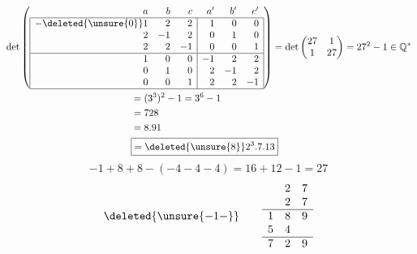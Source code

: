 \[
\begin{aligned}
&\det\left(
\begin{array}{|rrr|rrr|}
\multicolumn{1}{r}{a}&b&\multicolumn{1}{r}{c}&a'&b'&\multicolumn{1}{r}{c'}\\ \hline
-\deleted{\unsure{0}}1&2&2&1&0&0\\
2&-1&2&0&1&0\\
2&2&-1&0&0&1\\ \hline
1&0&0&-1&2&2\\
0&1&0&2&-1&2\\
0&0&1&2&2&-1\\ \hline
\end{array}\right)
=\det\begin{pmatrix}27&1\\1&27\end{pmatrix}=27^2-1\in\mathbb{Q}^{*}\\
&\hspace{13em}=(3^3)^2-1=3^6-1\\
&\hspace{13em}=728\\
&\hspace{13em}=8.91\\
&\hspace{13em}\boxed{=\deleted{\unsure{8}}2^3.7.13}
\end{aligned}
\]
\[
-1+8+8-(-4-4-4)=16+12-1=27
\]
\[
\deleted{\unsure{-1-}}\qquad
\begin{array}{rrr}
&2&7\\&2&7\\\hline
1&8&9\\5&4&\\\hline
7&2&9
\end{array}
\]
